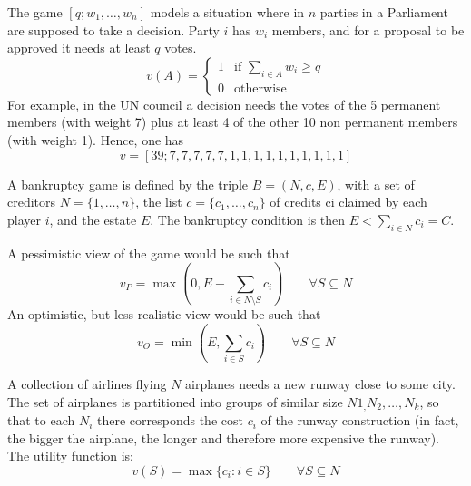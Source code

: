 \documentclass[../main.tex]{subfiles}
\begin{document}
\begin{example}
    The game $[q; w_1,\ldots,w_n]$ models a situation where in $n$ parties in a Parliament are supposed to take a decision. Party $i$ has $w_i$ members, and for a proposal to be approved it needs at least $q$ votes.
    \[
        v(A) =
        \begin{cases}
            1 & \text{if } \sum_{i \in A} w_i \geq q \\
            0 & \text{otherwise}
        \end{cases}
    \]
    For example, in the UN council a decision needs the votes of the 5 permanent members (with weight 7) plus at least 4 of the other 10 non permanent members (with weight 1). Hence, one has
    \[
        v = [39; 7,7,7,7,7,1,1,1,1,1,1,1,1,1,1]
    \]
\end{example}
\begin{example}
    A bankruptcy game is defined by the triple $B = (N,c,E)$, with a set of creditors $N= \{1,\ldots,n\}$, the list $c = \{c_1,\ldots,c_n\}$ of credits ci claimed by each player $i$,
    and the estate $E$. The bankruptcy condition is then $E < \sum_{i \in N} c_i = C$.

    A pessimistic view of the game would be such that
    \[
        v_P = \max \left(0, E - \sum_{i \in N \setminus S} c_i \right) \qquad \forall S \subseteq N
    \]
    An optimistic, but less realistic view would be such that
    \[
        v_O = \min \left(E, \sum_{i \in S} c_i \right) \qquad \forall S \subseteq N
    \]
\end{example}
\begin{example}
    A collection of airlines flying $N$ airplanes needs a new runway close to some city. The set of airplanes is partitioned into groups of similar size $N1_,N_2,\ldots, N_k$, so that to each $N_i$ there corresponds the cost $c_i$ of the runway construction (in fact, the bigger the airplane, the longer and therefore more expensive the runway). The utility function is:
    \[
        v (S) = \max\{c_i : i \in S\} \qquad \forall S \subseteq N
    \]
\end{example}
\end{document}
